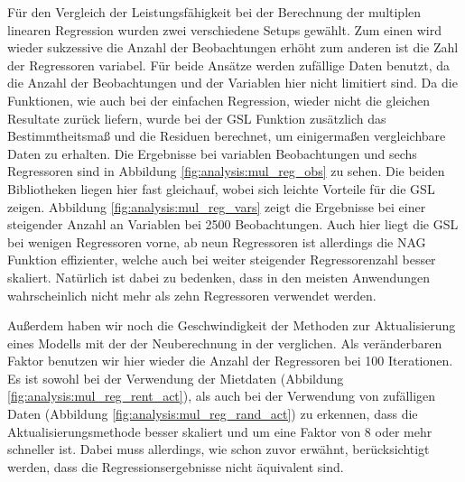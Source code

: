 Für den Vergleich der Leistungsfähigkeit bei der Berechnung der multiplen linearen Regression wurden zwei verschiedene Setups gewählt.
Zum einen wird wieder sukzessive die Anzahl der Beobachtungen erhöht zum anderen ist die Zahl der Regressoren variabel. 
Für beide Ansätze werden zufällige Daten benutzt, da die Anzahl der Beobachtungen und der Variablen hier nicht limitiert sind.
Da die Funktionen, wie auch bei der einfachen Regression, wieder nicht die gleichen Resultate zurück liefern, wurde bei der GSL Funktion zusätzlich das Bestimmtheitsmaß und die Residuen berechnet, um einigermaßen vergleichbare Daten zu erhalten.
Die Ergebnisse bei variablen Beobachtungen und sechs Regressoren sind in Abbildung \ref{fig:analysis:mul_reg_obs} zu sehen.
Die beiden Bibliotheken liegen hier fast gleichauf, wobei sich leichte Vorteile für die GSL zeigen.
Abbildung \ref{fig:analysis:mul_reg_vars} zeigt die Ergebnisse bei einer steigender Anzahl an Variablen bei 2500 Beobachtungen.
Auch hier liegt die GSL bei wenigen Regressoren vorne, ab neun Regressoren ist allerdings die NAG Funktion effizienter, welche auch bei weiter steigender Regressorenzahl besser skaliert.
Natürlich ist dabei zu bedenken, dass in den meisten Anwendungen wahrscheinlich nicht mehr als zehn Regressoren verwendet werden.

Außerdem haben wir noch die Geschwindigkeit der Methoden zur Aktualisierung eines Modells mit der der Neuberechnung in der \naglib verglichen.
Als veränderbaren Faktor benutzen wir hier wieder die Anzahl der Regressoren bei 100 Iterationen.
Es ist sowohl bei der Verwendung der Mietdaten (Abbildung \ref{fig:analysis:mul_reg_rent_act}), als auch bei der Verwendung von zufälligen Daten (Abbildung \ref{fig:analysis:mul_reg_rand_act}) zu erkennen, dass die Aktualisierungsmethode besser skaliert und um eine Faktor von 8 oder mehr schneller ist.
Dabei muss allerdings, wie schon zuvor erwähnt, berücksichtigt werden, dass die Regressionsergebnisse nicht äquivalent sind.

